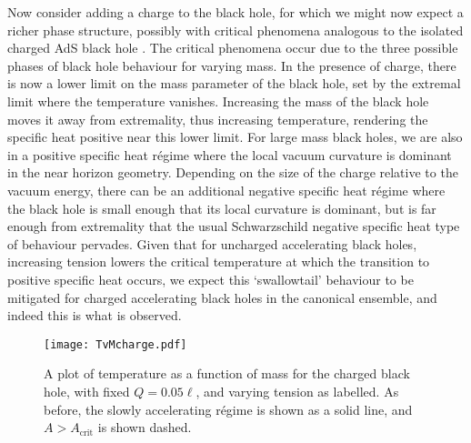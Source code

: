 \documentclass[
twoside,
openright,
frontopenright
]{dmathesis}
\begin{document}
Now consider adding a charge to the black hole, for which we might now expect a
richer phase structure, possibly with critical phenomena analogous to the
isolated charged AdS black hole
\cite{Chamblin:1999tk,Cvetic:1999ne,Chamblin:1999hg}. The critical phenomena
occur due to the three possible phases of black hole behaviour for varying mass.
In the presence of charge, there is now a lower limit on the mass parameter of
the black hole, set by the extremal limit where the temperature vanishes.
Increasing the mass of the black hole moves it away from extremality, thus
increasing temperature, rendering the specific heat positive near this lower
limit. For large mass black holes, we are also in a positive specific heat
r\'egime where the local vacuum curvature is dominant in the near horizon
geometry.  Depending on the size of the charge relative to the vacuum energy,
there can be an additional negative specific heat r\'egime where the black hole
is small enough that its local curvature is dominant, but is far enough from
extremality that the usual Schwarzschild negative specific heat type of
behaviour pervades.  Given that for uncharged accelerating black holes,
increasing tension lowers the critical temperature at which the transition to
positive specific heat occurs, we expect this `swallowtail' behaviour to be
mitigated for charged accelerating black holes in the canonical ensemble, and
indeed this is what is observed.
\begin{figure}
  \centering
  \texttt{[image: TvMcharge.pdf]}
  \caption{\label{fig:TvMcharge}A plot of temperature as a function of mass for
    the charged black hole, with fixed $Q=0.05\ell$, and varying tension as
    labelled. As before, the slowly accelerating r\'egime is shown as a solid
    line, and $A>A_\mathrm{crit}$ is shown dashed.}
\end{figure}
\end{document}
